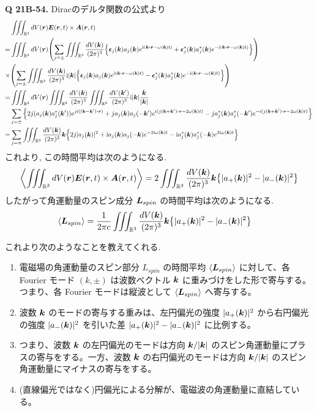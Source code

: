 \documentclass[uplatex,a4paper,dvipdfmx]{jsarticle}
\theoremstyle{definition}
\begin{document}
\textbf{Q 21B-54.}
Diracのデルタ関数の公式より
\begin{align}
         & \iiint_{\RR^3}dV(\rr)\EE(\rr, t)\times\AA(\rr, t)                                                                                                                                                                    \\
  =      & \iiint_{\RR^3}dV(\rr)\qty(\sum_{j=\pm}\iiint_{\RR^3}\frac{dV(\kk)}{(2\pi)^3}\qty{\ee_j(\kk)a_j(\kk)e^{\ii(\kk\vdot\rr - \omega(\kk)t)} + \ee_j^*(\kk)a_j^*(\kk)e^{-\ii(\kk\vdot\rr - \omega(\kk)t)}})                \\
  \times & \qty(\sum_{j=\pm}\iiint_{\RR^3}\frac{dV(\kk)}{(2\pi)^3}\ii|\kk|\qty{\ee_j(\kk)a_j(\kk)e^{\ii(\kk\vdot\rr - \omega(\kk)t)} - \ee_j^*(\kk)a_j^*(\kk)e^{-\ii(\kk\vdot\rr - \omega(\kk)t)}})                             \\
  =      & \iiint_{\RR^3}dV(\rr)\iiint_{\RR^3}\frac{dV(\kk)}{(2\pi)^3}\iiint_{\RR^3}\frac{dV(\kk')}{(2\pi)^3}\ii|\kk|\frac{\kk}{|\kk|}                                                                                          \\
         & \sum_{j=\pm}\qty{2j(a_j(\kk)a_j^*(\kk'))e^{j\ii((\kk - \kk')\vdot\rr)} + ja_j(\kk)a_j(-\kk')e^{\ii(j(\kk + \kk')\vdot\rr - 2\omega(\kk)t)} - ja_j^*(\kk)a_j^*(-\kk')e^{-\ii(j(\kk + \kk')\vdot\rr - 2\omega(\kk)t)}} \\
  =      & \sum_{j=\pm}\iiint_{\RR^3}\frac{dV(\kk)}{(2\pi)^3}\kk\qty{2j|a_j(\kk)|^2 + \ii a_j(\kk)a_j(-\kk)e^{-2\ii\omega(\kk)t} - \ii a_j^*(\kk)a_j^*(-\kk)e^{2\ii\omega(\kk)t}}
\end{align}
これより, この時間平均は次のようになる.
\begin{align}
  \left\langle\iiint_{\mathbb{R}^3}dV(\vb*{r})\vb*{E}(\vb*{r}, t)\times\vb*{A}(\vb*{r}, t)\right\rangle = 2\iiint_{\mathbb{R}^3}\frac{dV(\vb*{k})}{(2\pi)^3}\vb*{k}\qty{|a_+(\vb*{k})|^2 - |a_-(\vb*{k})|^2}
\end{align}
したがって角運動量のスピン成分 $\vb*{L}_{spin}$ の時間平均は次のようになる.
\begin{align}
  \langle\vb*{L}_{spin}\rangle & = \frac{1}{2\pi c}\iiint_{\mathbb{R}^3}\frac{dV(\vb*{k})}{(2\pi)^3}\vb*{k}\qty{|a_+(\vb*{k})|^2 - |a_-(\vb*{k})|^2}
\end{align}

これより次のようなことを教えてくれる.
\begin{enumerate}
  \item 電磁場の角運動量のスピン部分 $L_{spin}$ の時間平均 $\langle\vb*{L}_{spin}\rangle$ に対して、各 Fourier モード $(k, \pm)$ は波数ベクトル $\vb*{k}$ に重みづけをした形で寄与する。つまり、各 Fourier モードは縦波として $\langle\vb*{L}_{spin}\rangle$ へ寄与する。
  \item 波数 $\vb*{k}$ のモードの寄与する重みは、左円偏光の強度 $|a_+(\vb*{k})|^2$ から右円偏光の強度 $|a_-(\vb*{k})|^2$ を引いた差 $|a_+(\vb*{k})|^2 - |a_-(\vb*{k})|^2$ に比例する。
  \item つまり、波数 $\vb*{k}$ の左円偏光のモードは方向 $\vb*{k}/|\vb*{k}|$ のスピン角運動量にプラスの寄与をする。一方、波数 $\vb*{k}$ の右円偏光のモードは方向 $\vb*{k}/|\vb*{k}|$ のスピン角運動量にマイナスの寄与をする。
  \item (直線偏光ではなく)円偏光による分解が、電磁波の角運動量に直結している。
\end{enumerate}
\end{document}
